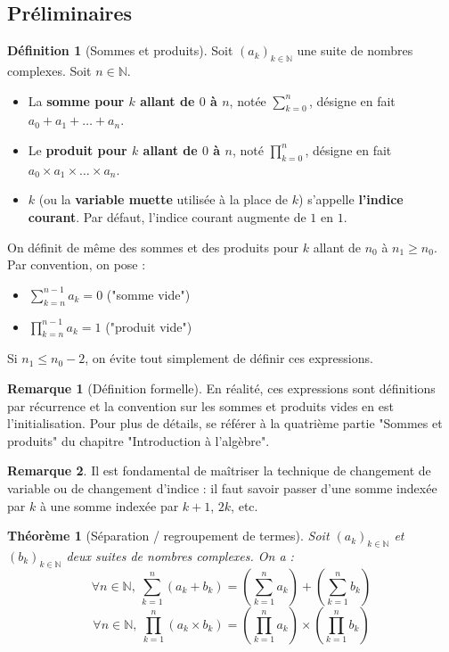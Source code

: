 \documentclass[french]{book}
\newcommand{\N}{\mathbb{N}}
\theoremstyle{plain}
\newtheorem{thm}{Théorème}[chapter]
\theoremstyle{definition}
\newtheorem{dfn}{Définition}[chapter]
\newtheorem{rmq}{Remarque}[chapter]
\theoremstyle{remark}
\begin{document}
\subsection{Préliminaires}
\begin{dfn}[Sommes et produits]
	Soit $(a_k)_{k\in\N}$ une suite de nombres complexes. Soit $n\in\N$.
	\begin{itemize}
		\item La \textbf{somme pour $k$ allant de $0$ à $n$}, notée $\displaystyle\sum_{k=0}^{n}$, désigne en fait $a_0+a_1+\ldots+a_n$.
		\item Le \textbf{produit pour $k$ allant de $0$ à $n$}, noté $\displaystyle\prod_{k=0}^{n}$, désigne en fait $a_0\times a_1\times\ldots\times a_n$.
		\item $k$ (ou la \textbf{variable muette} utilisée à la place de $k$) s'appelle \textbf{l'indice courant}. Par défaut, l'indice courant augmente de $1$ en $1$.
	\end{itemize}
	On définit de même des sommes et des produits pour $k$ allant de $n_0$ à $n_1\geqslant n_0$. Par convention, on pose : \begin{itemize}
		\item $\displaystyle\sum_{k=n}^{n-1}a_k=0$ ("somme vide")
		\item $\displaystyle\prod_{k=n}^{n-1}a_k=1$ ("produit vide")
	\end{itemize}
	Si $n_1\leqslant n_0-2$, on évite tout simplement de définir ces expressions.
\end{dfn}
\begin{rmq}[Définition formelle]
	En réalité, ces expressions sont définitions par récurrence et la convention sur les sommes et produits vides en est l'initialisation. Pour plus de détails, se référer à la quatrième partie "Sommes et produits" du chapitre "Introduction à l'algèbre".
\end{rmq}
\begin{rmq}
	Il est fondamental de maîtriser la technique de changement de variable ou de changement d'indice : il faut savoir passer d'une somme indexée par $k$ à une somme indexée par $k+1$, $2k$, etc.
\end{rmq}
\begin{thm}[Séparation / regroupement de termes]
	Soit $(a_k)_{k\in\N}$ et $(b_k)_{k\in\N}$ deux suites de nombres complexes. On a : $$\forall n\in\N,\ \sum_{k=1}^{n}(a_k+b_k)=\left(\sum_{k=1}^{n}a_k\right)+\left(\sum_{k=1}^{n}b_k\right)$$
	$$\forall n\in\N,\ \prod_{k=1}^{n}(a_k\times b_k)=\left(\prod_{k=1}^{n}a_k\right)\times\left(\prod_{k=1}^{n}b_k\right)$$
\end{thm}
\end{document}
